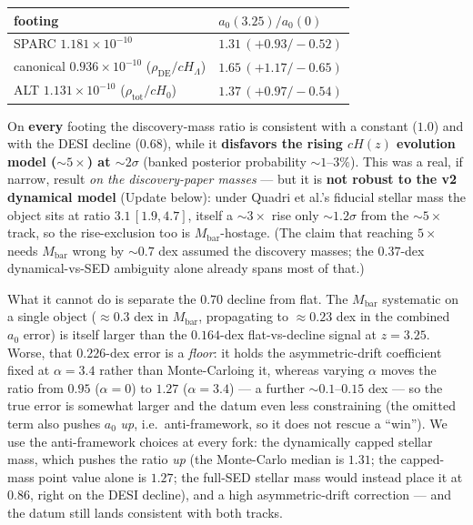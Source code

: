 \documentclass[
]{article}
\newcounter{none} %
\begin{document}
{\def\LTcaptype{none} %
\begin{longtable}[]{@{}
  >{\raggedright\arraybackslash}p{}
  >{\raggedright\arraybackslash}p{}@{}}
\toprule\noalign{}
\begin{minipage}[b]{\linewidth}\raggedright
footing
\end{minipage} & \begin{minipage}[b]{\linewidth}\raggedright
\(a_0(3.25)/a_0(0)\)
\end{minipage} \\
\midrule\noalign{}
\endhead
\bottomrule\noalign{}
\endlastfoot
SPARC \(1.181\times10^{-10}\) & \(1.31\,(+0.93/-0.52)\) \\
canonical \(0.936\times10^{-10}\) (\(\rho_\mathrm{DE}/cH_\Lambda\)) &
\(1.65\,(+1.17/-0.65)\) \\
ALT \(1.131\times10^{-10}\) (\(\rho_\mathrm{tot}/cH_0\)) &
\(1.37\,(+0.97/-0.54)\) \\
\end{longtable}
}

On \textbf{every} footing the discovery-mass ratio is consistent with a
constant (\(1.0\)) and with the DESI decline (\(0.68\)), while it
\textbf{disfavors the rising \(cH(z)\) evolution model (\(\sim5\times\))
at \(\sim2\sigma\)} (banked posterior probability \(\sim1\)--\(3\%\)).
This was a real, if narrow, result \emph{on the discovery-paper masses}
--- but it is \textbf{not robust to the v2 dynamical model} (Update
below): under Quadri et al.'s fiducial stellar mass the object sits at
ratio \(3.1\,[1.9,4.7]\), itself a \(\sim3\times\) rise only
\(\sim1.2\sigma\) from the \(\sim5\times\) track, so the rise-exclusion
too is \(M_\mathrm{bar}\)-hostage. (The claim that reaching \(5\times\)
needs \(M_\mathrm{bar}\) wrong by \(\sim0.7\) dex assumed the discovery
masses; the \(0.37\)-dex dynamical-vs-SED ambiguity alone already spans
most of that.)

What it cannot do is separate the \(0.70\) decline from flat. The
\(M_\mathrm{bar}\) systematic on a single object (\(\approx0.3\) dex in
\(M_\mathrm{bar}\), propagating to \(\approx0.23\) dex in the combined
\(a_0\) error) is itself larger than the \(0.164\)-dex flat-vs-decline
signal at \(z=3.25\). Worse, that \(0.226\)-dex error is a \emph{floor}:
it holds the asymmetric-drift coefficient fixed at \(\alpha=3.4\) rather
than Monte-Carloing it, whereas varying \(\alpha\) moves the ratio from
\(0.95\) (\(\alpha=0\)) to \(1.27\) (\(\alpha=3.4\)) --- a further
\(\sim0.1\)--\(0.15\) dex --- so the true error is somewhat larger and
the datum even less constraining (the omitted term also pushes \(a_0\)
\emph{up}, i.e.~anti-framework, so it does not rescue a ``win''). We use
the anti-framework choices at every fork: the dynamically capped stellar
mass, which pushes the ratio \emph{up} (the Monte-Carlo median is
\(1.31\); the capped-mass point value alone is \(1.27\); the full-SED
stellar mass would instead place it at \(0.86\), right on the DESI
decline), and a high asymmetric-drift correction --- and the datum still
lands consistent with both tracks.
\end{document}
